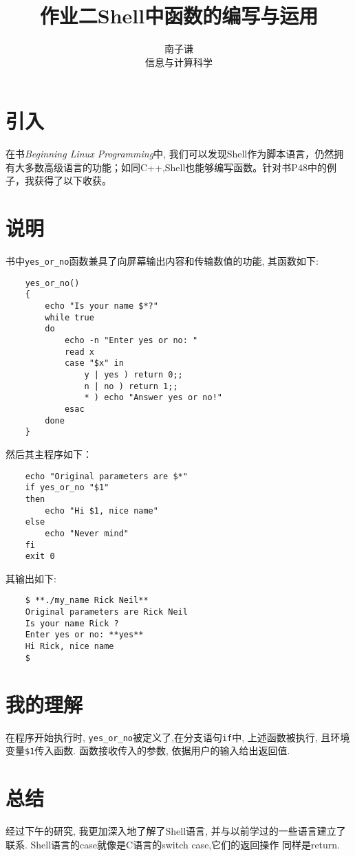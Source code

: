 \documentclass{ctexart}
\title{作业二Shell中函数的编写与运用}
\author{南子谦 \\ 信息与计算科学\quad 3210104676}
\begin{document}
\maketitle

\section{引入}
在书\textit{Beginning Linux Programming}中, 我们可以发现Shell作为脚本语言，仍然拥有大多数高级语言的功能；如同C++,Shell也能够编写函数。针对书P48中的例子，我获得了以下收获。

\section{说明}
书中\verb!yes_or_no!函数兼具了向屏幕输出内容和传输数值的功能, 其函数如下:
\begin{verbatim}
    yes_or_no()
    {
        echo "Is your name $*?"
        while true
        do
            echo -n "Enter yes or no: "
            read x
            case "$x" in
                y | yes ) return 0;;
                n | no ) return 1;;
                * ) echo "Answer yes or no!"
            esac
        done
    }
\end{verbatim}

\par 然后其主程序如下：

\begin{verbatim}
    echo "Original parameters are $*"
    if yes_or_no "$1"
    then
        echo "Hi $1, nice name"
    else
        echo "Never mind"
    fi
    exit 0
\end{verbatim}

\par 其输出如下:

\begin{verbatim}
    $ **./my_name Rick Neil**
    Original parameters are Rick Neil
    Is your name Rick ?
    Enter yes or no: **yes**
    Hi Rick, nice name
    $
\end{verbatim}

\section{我的理解}
在程序开始执行时, \verb!yes_or_no!被定义了,在分支语句\verb!if!中, 上述函数被执行, 且环境变量\verb!$1!传入函数. 函数接收传入的参数, 依据用户的输入给出返回值. 

\section{总结}
经过下午的研究, 我更加深入地了解了Shell语言, 并与以前学过的一些语言建立了联系. Shell语言的case就像是C语言的switch case,它们的返回操作
同样是return.





\cite{abcd2022}
\end{document}
